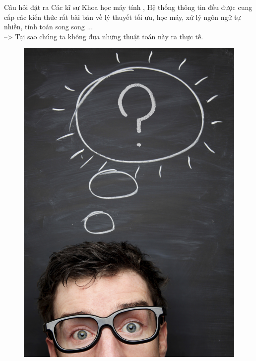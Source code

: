 \documentclass{beamer}
\begin{document}
\begin{frame}{Câu hỏi đặt ra}
Các kĩ sư Khoa học máy tính , Hệ thống thông tin đều được cung cấp các kiến thức rất bài bản về lý thuyết tối ưu, học máy, xử lý ngôn ngữ tự nhiền, tính toán  song song  ... \\
--> Tại sao chúng ta không đưa những thuật toán này ra thực tế. 
\begin{figure}
\begin{center}
\includegraphics[scale=0.08]{1.jpg}
\end{center}

\end{figure}
\end{frame}
\end{document}
